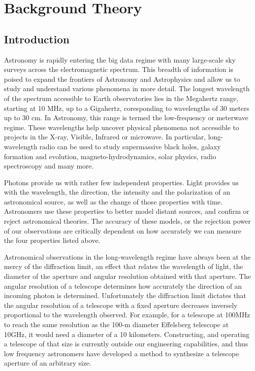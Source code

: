 \chapter{Background Theory}

\label{ch:background}

\section{Introduction}

Astronomy is rapidly entering the big data regime with many large-scale sky surveys across the electromagnetic spectrum. This breadth of information is poised to expand the frontiers of Astronomy and Astrophysics and allow us to study and understand various phenomena in more detail. The longest wavelength of the spectrum accessible to Earth observatories lies in the Megahertz range, starting at 10 MHz, up to a Gigahertz, coresponding to wavelengths of 30 meters up to 30 cm. In Astronomy, this range is termed the low-frequency or meterwave regime. These wavelengths help uncover physical phenomena not accessible to projects in the X-ray, Visible, Infrared or microwave. In particular, long-wavelength radio can be used to study supermassive black holes, galaxy formation and evolution, magneto-hydrodynamics, solar physics, radio spectroscopy and many more. 

Photons provide us with rather few independent properties. Light provides us with the wavelength, the direction, the intensity  and the polarization of an astronomical source, as well as the change of those properties with time. Astronomers use these properties to better model distant sources, and confirm or reject astronomical theories. The accuracy of these models, or the rejection power of our observations are critically dependent on how accurately we can measure the four properties listed above. 

Astronomical observations in the long-wavelength regime have always been at the mercy of the diffraction limit, an effect that relates the wavelength of light, the diameter of the aperture and angular resolution obtained with that aperture. The angular resolution of a telescope determines how accurately the direction of an incoming photon is determined. Unfortunately the diffraction limit dictates that the angular resolution of a telescope with a fixed aperture decreases inversely proportional to the wavelength observed. For example, for a telescope at 100MHz to reach the same resolution as the 100-m diameter Effelsberg telescope at 10GHz, it would need a diameter of a 10 kilometers. Constructing, and operating a telescope of that size is currently outside our engineering capabilities, and thus low frequency astronomers have developed a method to synthesize a telescope aperture of an arbitrary size. 

